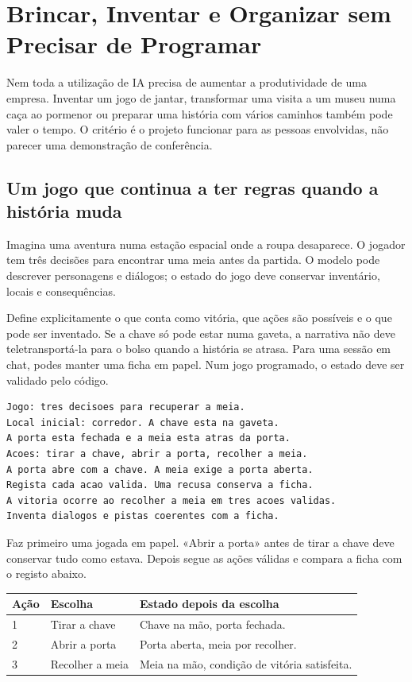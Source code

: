 \chapter{Brincar, Inventar e Organizar sem Precisar de Programar}
\label{ch:brincar}

Nem toda a utilização de IA precisa de aumentar a produtividade de uma empresa. Inventar um jogo de jantar, transformar uma visita a um museu numa caça ao pormenor ou preparar uma história com vários caminhos também pode valer o tempo. O critério é o projeto funcionar para as pessoas envolvidas, não parecer uma demonstração de conferência.

\section{Um jogo que continua a ter regras quando a história muda}
Imagina uma aventura numa estação espacial onde a roupa desaparece. O jogador tem três decisões para encontrar uma meia antes da partida. O modelo pode descrever personagens e diálogos; o estado do jogo deve conservar inventário, locais e consequências.

Define explicitamente o que conta como vitória, que ações são possíveis e o que pode ser inventado. Se a chave só pode estar numa gaveta, a narrativa não deve teletransportá-la para o bolso quando a história se atrasa. Para uma sessão em chat, podes manter uma ficha em papel. Num jogo programado, o estado deve ser validado pelo código.

\begin{lstlisting}
Jogo: tres decisoes para recuperar a meia.
Local inicial: corredor. A chave esta na gaveta.
A porta esta fechada e a meia esta atras da porta.
Acoes: tirar a chave, abrir a porta, recolher a meia.
A porta abre com a chave. A meia exige a porta aberta.
Regista cada acao valida. Uma recusa conserva a ficha.
A vitoria ocorre ao recolher a meia em tres acoes validas.
Inventa dialogos e pistas coerentes com a ficha.
\end{lstlisting}
Faz primeiro uma jogada em papel. «Abrir a porta» antes de tirar a chave deve conservar tudo como estava. Depois segue as ações válidas e compara a ficha com o registo abaixo.

\begin{center}
\small
\begin{tabularx}{\textwidth}{@{}p{}XX@{}}
\toprule
Ação & Escolha & Estado depois da escolha \\
\midrule
1 & Tirar a chave & Chave na mão, porta fechada. \\
2 & Abrir a porta & Porta aberta, meia por recolher. \\
3 & Recolher a meia & Meia na mão, condição de vitória satisfeita. \\
\bottomrule
\end{tabularx}
\end{center}

